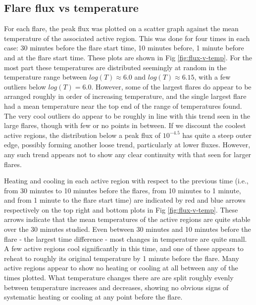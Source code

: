\documentclass[namedreferences]{solarphysics}
\begin{document}
\subsection{Flare flux vs temperature}
For each flare, the peak flux was plotted on a scatter graph against the mean temperature of the associated active region. %
This was done for four times in each case: 30 minutes before the flare start time, 10 minutes before, 1 minute before and at the flare start time.
These plots are shown in Fig \ref{fig:flux-v-temp}.
For the most part these temperatures are distributed seemingly at random in the temperature range between $log(T)\approx6.0$ and $log(T)\approx6.15$, with a few outliers below $log(T)=6.0$.
However, some of the largest flares do appear to be arranged roughly in order of increasing temperature, and the single largest flare had a mean temperature near the top end of the range of temperatures found.
The very cool outliers do appear to be roughly in line with this trend seen in the large flares, though with few or no points in between.
If we discount the coolest active regions, the distribution below a peak flux of $10^{-4.5}$ has quite a steep outer edge, possibly forming another loose trend, particularly at lower fluxes.
However, any such trend appears not to show any clear continuity with that seen for larger flares.

Heating and cooling in each active region with respect to the previous time (i.e., from 30 minutes to 10 minutes before the flares, from 10 minutes to 1 minute, and from 1 minute to the flare start time) are indicated by red and blue arrows respectively on the top right and bottom plots in Fig \ref{fig:flux-v-temp}.
These arrows indicate that the mean temperatures of the active regions are quite stable over the 30 minutes studied.
Even between 30 minutes and 10 minutes before the flare - the largest time difference - most changes in temperature are quite small.
A few active regions cool significantly in this time, and one of these appears to reheat to roughly its original temperature by 1 minute before the flare.
Many active regions appear to show no heating or cooling at all between any of the times plotted.
What temperature changes there are are split roughly evenly between temperature increases and decreases, showing no obvious signs of systematic heating or cooling at any point before the flare.
\end{document}
